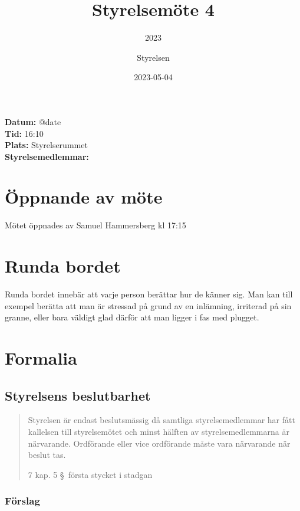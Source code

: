\documentclass[protokoll]{dvd}
\begin{document}
\title{Styrelsemöte 4}
\subtitle{2023}
\author{Styrelsen}
\date{2023-05-04}


\textbf{Datum:} \csname @date\endcsname\\
\textbf{Tid:} 16:10\\
\textbf{Plats:} Styrelserummet\\
\textbf{Styrelsemedlemmar:}
\begin{närvarande_förtroendevalda}
\end{närvarande_förtroendevalda}

\section{Öppnande av möte}

Mötet öppnades av Samuel Hammersberg kl 17:15

\section{Runda bordet}

Runda bordet innebär att varje person berättar hur de känner sig.
Man kan till exempel berätta att man är stressad på grund av en inlämning, irriterad på sin granne, eller bara väldigt glad därför att man ligger i fas med plugget.

\section{Formalia}

\subsection{Styrelsens beslutbarhet}

\blockquote[7 kap. 5 \S~första stycket i stadgan][]{%
    Styrelsen är endast beslutsmässig då samtliga styrelsemedlemmar har fått kallelsen till styrelsemötet och minst hälften av styrelsemedlemmarna är närvarande.
    Ordförande eller vice ordförande måste vara närvarande när beslut tas.
}

\subsubsection*{Förslag}
\end{document}
